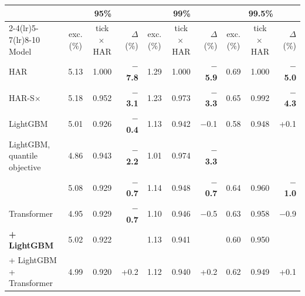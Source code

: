\begin{tabular}{@{}lccrccrccr@{}}
\toprule
 & \multicolumn{3}{c}{95\%} & \multicolumn{3}{c}{99\%} & \multicolumn{3}{c}{99.5\%} \\
\cmidrule(lr){2-4}\cmidrule(lr){5-7}\cmidrule(lr){8-10}
Model & exc. (\%) & tick $\times$\,HAR & $\Delta$ (\%) & exc. (\%) & tick $\times$\,HAR & $\Delta$ (\%) & exc. (\%) & tick $\times$\,HAR & $\Delta$ (\%) \\
\midrule
HAR & 5.13 & 1.000 & \textbf{$-$7.8} & 1.29 & 1.000 & \textbf{$-$5.9} & 0.69 & 1.000 & \textbf{$-$5.0} \\
HAR-S$\times$ & 5.18 & 0.952 & \textbf{$-$3.1} & 1.23 & 0.973 & \textbf{$-$3.3} & 0.65 & 0.992 & \textbf{$-$4.3} \\
LightGBM & 5.01 & 0.926 & \textbf{$-$0.4} & 1.13 & 0.942 & $-$0.1 & 0.58 & 0.948 & +0.1 \\
LightGBM, quantile objective & 4.86 & 0.943 & \textbf{$-$2.2} & 1.01 & 0.974 & \textbf{$-$3.3} &  &  &  \\
\HQ{} & 5.08 & 0.929 & \textbf{$-$0.7} & 1.14 & 0.948 & \textbf{$-$0.7} & 0.64 & 0.960 & \textbf{$-$1.0} \\
Transformer & 4.95 & 0.929 & \textbf{$-$0.7} & 1.10 & 0.946 & $-$0.5 & 0.63 & 0.958 & $-$0.9 \\
\textbf{\HQ{} + LightGBM} & 5.02 & 0.922 &  & 1.13 & 0.941 &  & 0.60 & 0.950 &  \\
\HQ{} + LightGBM + Transformer & 4.99 & 0.920 & +0.2 & 1.12 & 0.940 & +0.2 & 0.62 & 0.949 & +0.1 \\
\bottomrule
\end{tabular}
